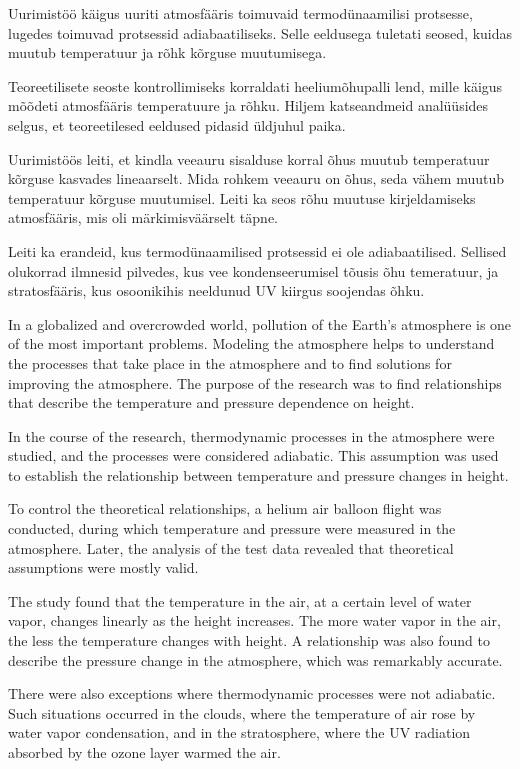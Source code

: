 \documentclass{trkut}%
\begin{document}
Uurimistöö käigus uuriti atmosfääris toimuvaid termodünaamilisi protsesse, lugedes toimuvad protsessid adiabaatiliseks. Selle eeldusega tuletati seosed, kuidas muutub temperatuur ja rõhk kõrguse muutumisega.

Teoreetilisete seoste kontrollimiseks korraldati heeliumõhupalli lend, mille käigus mõõdeti atmosfääris temperatuure ja rõhku. Hiljem katseandmeid analüüsides selgus, et teoreetilesed eeldused pidasid üldjuhul paika.

Uurimistöös leiti, et kindla veeauru sisalduse korral õhus muutub temperatuur kõrguse kasvades lineaarselt. Mida rohkem veeauru on õhus, seda vähem muutub temperatuur kõrguse muutumisel. Leiti ka seos rõhu muutuse kirjeldamiseks atmosfääris, mis oli märkimisväärselt täpne.

Leiti ka erandeid, kus termodünaamilised protsessid ei ole adiabaatilised. Sellised olukorrad ilmnesid pilvedes, kus vee kondenseerumisel tõusis õhu temeratuur, ja stratosfääris, kus osoonikihis neeldunud UV kiirgus soojendas õhku.


In a globalized and overcrowded world, pollution of the Earth's atmosphere is one of the most important problems. Modeling the atmosphere helps to understand the processes that take place in the atmosphere and to find solutions for improving the atmosphere. The purpose of the research was to find relationships that describe the temperature and pressure dependence on height.

In the course of the research, thermodynamic processes in the atmosphere were studied, and the processes were considered adiabatic. This assumption was used to establish the relationship between temperature and pressure changes in height.

To control the theoretical relationships, a helium air balloon flight was conducted, during which temperature and pressure were measured in the atmosphere. Later, the analysis of the test data revealed that theoretical assumptions were mostly valid.

The study found that the temperature in the air, at a certain level of water vapor, changes linearly as the height increases. The more water vapor in the air, the less the temperature changes with height. A relationship was also found to describe the pressure change in the atmosphere, which was remarkably accurate.

There were also exceptions where thermodynamic processes were not adiabatic. Such situations occurred in the clouds, where the temperature of air rose by water vapor condensation, and in the stratosphere, where the UV radiation absorbed by the ozone layer warmed the air.
\end{document}
